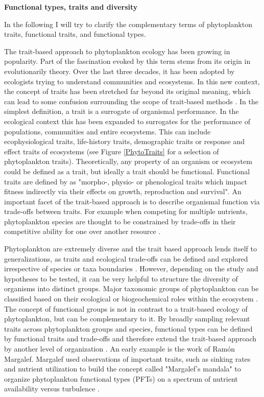 {\textbf{Functional types, traits and diversity}}


In the following I will try to clarify the complementary terms of phytoplankton traits, functional traits, and functional types. 

The trait-based approach to phytoplankton ecology has been growing in popularity. Part of the fascination evoked by this term stems from its origin in evolutionarily theory. Over the last three decades, it has been adopted by ecologists trying to understand communities and ecosystems. In this new context, the concept of traits has been stretched far beyond its original meaning, which can lead to some confusion surrounding the scope of trait-based methods \citep{Violle2007c}. In the simplest definition, a trait is a surrogate of organismal performance. In the ecological context this has been expanded to surrogates for the performance of populations, communities and entire ecosystems. This can include ecophysiological traits, life-history traits, demographic traits or response and effect traits of ecosystems (see Figure \ref{PhytoTraits} for a selection of phytoplankton traits). Theoretically, any property of an organism or ecosystem could be defined as a trait, but ideally a trait should be functional. Functional traits are defined by \cite{Violle2007c} as "morpho-, physio- or phenological traits which impact fitness indirectly via their effects on growth, reproduction and survival". An important facet of the trait-based approach is to describe organismal function via trade-offs between traits. For example when competing for multiple nutrients, phytoplankton species are thought to be constrained by trade-offs in their competitive ability for one over another resource \citep{Tilman1990}. 

Phytoplankton are extremely diverse and the trait based approach lends itself to generalizations, as traits and ecological trade-offs can be defined and explored irrespective of species or taxa boundaries \citep{McGill2006}. However, depending on the study and hypotheses to be tested, it can be very helpful to structure the diversity of organisms into distinct groups. Major taxonomic groups of phytoplankton can be classified based on their ecological or biogeochemical roles within the ecosystem \citep{Iglesias-Rodriguez2002,Flynn2015}. The concept of functional groups is not in contrast to a trait-based ecology of phytoplankton, but can be complementary to it. By broadly sampling relevant traits across phytoplankton groups and species, functional types can be defined by functional traits and trade-offs and therefore extend the trait-based approach by another level of organization \citep{Litchman2007d}. An early example is the work of Ramón Margalef. Margalef used observations of important traits, such as sinking rates and nutrient utilization to build the concept called "Margalef's mandala" to organize phytoplankton functional types (PFTs) on a spectrum of nutrient availability versus turbulence \citep{Margalef1978}. 

